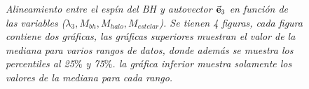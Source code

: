 \begin{figure} 
\centering 
{}\vspace{0mm} 
 \vspace{0mm} 
\vspace{0.1mm} 
\caption{\emph{Alineamiento entre el espín del BH y autovector $\vec{\bf{e}}_3$ en función de las variables ($\lambda_{3}, M_{bh}, M_{halo}, M_{estelar}$). Se tienen 4 figuras, cada figura contiene dos gráficas, las gráficas superiores muestran el valor de la mediana para varios rangos de datos, donde además se muestra los percentiles al 25$\%$ y 75$\%$. la gráfica inferior muestra solamente los valores de la mediana para cada rango.} }
\label{fig: median dispercion} 
\end{figure}


